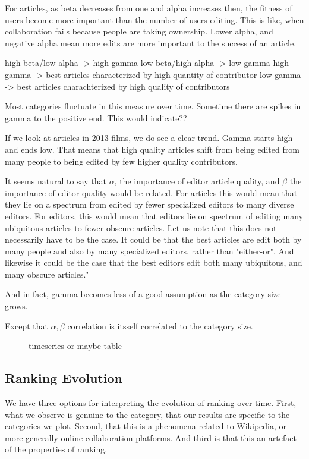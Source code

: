 \documentclass{acm_proc_article-sp}
\begin{document}
For articles, as beta decreases from one and alpha increases then, the fitness of users become more important than the number of users editing. This is like, when collaboration fails because people are taking ownership. Lower alpha, and negative alpha mean more edits are more important to the success of an article.

high beta/low alpha -> high gamma
low beta/high alpha -> low gamma
high gamma -> best articles characterized by high quantity of contributor
low gamma -> best articles charachterized by high quality of contributors


Most categories fluctuate in this measure over time. Sometime there are spikes in gamma to the positive end. This would indicate??

If we look at articles in 2013 films, we do see a clear trend. Gamma starts high and ends low. That means that high quality articles shift from being edited from many people to being edited by few higher quality contributors.

It seems natural to say that $\alpha$, the importance of editor article quality, and $\beta$ the importance of editor quality would be related. For articles this would mean that they lie on a spectrum from  edited by fewer specialized editors to  many diverse editors. For editors, this would mean that editors lie on spectrum of editing many ubiquitous articles to fewer obscure articles. Let us note that this does not necessarily have to be the case. It could be that the best articles are edit both by many people and also by many specialized editors, rather than "either-or". And likewise it could be the case that  the best editors edit both many ubiquitous, and many obscure articles."

And in fact, gamma becomes less of a good assumption as the category size grows. 

Except that $\alpha , \beta$ correlation is itsself correlated to the category size.





\begin{figure}[!t]
\centering
\caption{timeseries or maybe table}
\label{timeseries or maybe table}
\end{figure}

\subsection{Ranking Evolution}
We have three options for interpreting the evolution of ranking over time. First, what we observe is genuine to the category, that our results are specific to the categories we plot. Second, that this is a phenomena related to Wikipedia, or more generally online collaboration platforms. And third is that this an artefact of the properties of ranking. 
\end{document}
